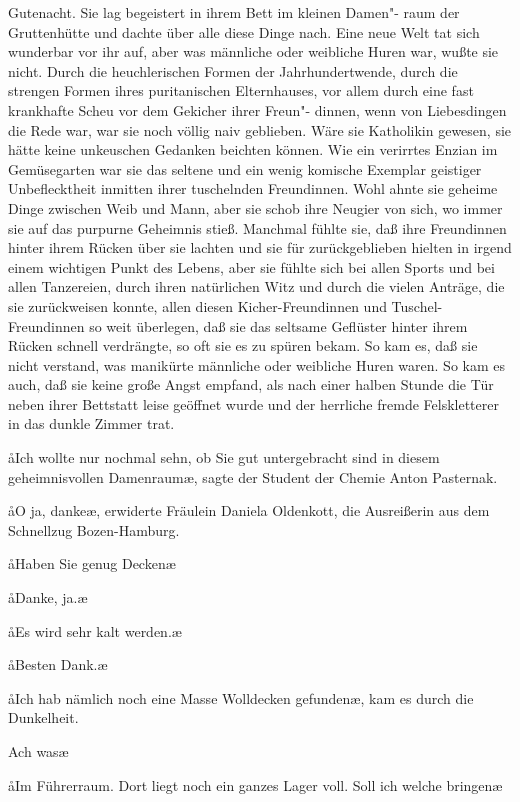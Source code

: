 Gutenacht. Sie lag begeistert in ihrem Bett im kleinen Damen"-%
raum der Gruttenhütte und dachte über alle diese Dinge nach.
Eine neue Welt tat sich wunderbar vor ihr auf, aber was
männliche oder weibliche Huren war, wußte sie nicht. Durch
die heuchlerischen Formen der Jahrhundertwende, durch die
strengen Formen ihres puritanischen Elternhauses, vor allem
durch eine fast krankhafte Scheu vor dem Gekicher ihrer Freun"-%
dinnen, wenn von Liebesdingen die Rede war, war sie noch
völlig naiv geblieben. Wäre sie Katholikin gewesen, sie hätte
keine unkeuschen Gedanken beichten können. Wie ein verirrtes
Enzian im Gemüsegarten war sie das seltene und ein wenig
komische Exemplar geistiger Unbeflecktheit inmitten ihrer
tuschelnden Freundinnen. Wohl ahnte sie geheime Dinge
zwischen Weib und Mann, aber sie schob ihre Neugier von sich,
wo immer sie auf das purpurne Geheimnis stieß. Manchmal
fühlte sie, daß ihre Freundinnen hinter ihrem Rücken über
sie lachten und sie für zurückgeblieben hielten in irgend einem
wichtigen Punkt des Lebens, aber sie fühlte sich bei allen
Sports und bei allen Tanzereien, durch ihren natürlichen
Witz und durch die vielen Anträge, die sie zurückweisen konnte,
allen diesen Kicher-Freundinnen und Tuschel-Freundinnen
so weit überlegen, daß sie das seltsame Geflüster hinter ihrem
Rücken schnell verdrängte, so oft sie es zu spüren bekam. So
kam es, daß sie nicht verstand, was manikürte männliche oder
weibliche Huren waren. So kam es auch, daß sie keine große
Angst empfand, als nach einer halben Stunde die Tür neben
ihrer Bettstatt leise geöffnet wurde und der herrliche fremde
Felskletterer in das dunkle Zimmer trat.

\aa{}Ich wollte nur nochmal sehn, ob Sie gut untergebracht sind
in diesem geheimnisvollen Damenraum\ae{}, sagte der Student
der Chemie Anton Pasternak.

\aa{}O ja, danke\ae{}, erwiderte Fräulein Daniela Oldenkott, die
Ausreißerin aus dem Schnellzug Bozen-Hamburg.

\aa{}Haben Sie genug Decken\frag{}\ae{}

\aa{}Danke, ja.\ae{}

\aa{}Es wird sehr kalt werden.\ae{}

\aa{}Besten Dank.\ae{}

\aa{}Ich hab nämlich noch eine Masse Wolldecken gefunden\ae{}, kam
es durch die Dunkelheit.

\aanah{}Ach was\frag{}\ae{}

\aa{}Im Führerraum. Dort liegt noch ein ganzes Lager voll. Soll
ich welche bringen\frag{}\ae{}

